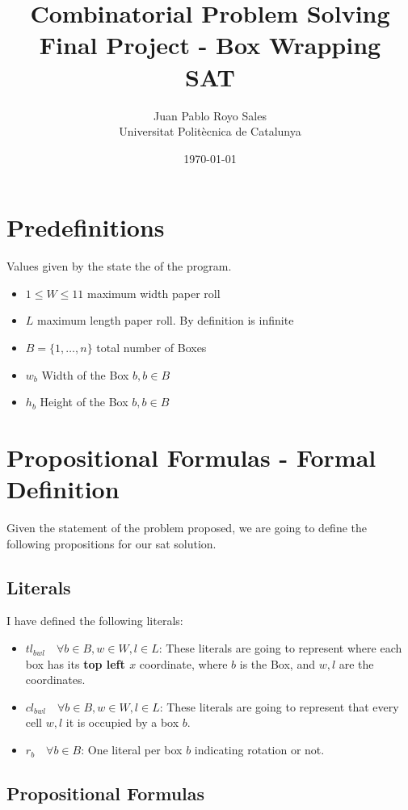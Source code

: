 \documentclass[12pt, a4paper]{article}
\title{%
      Combinatorial Problem Solving \\
      Final Project - Box Wrapping \\
      SAT
}
\author{%
  Juan Pablo Royo Sales \\
  \small{Universitat Politècnica de Catalunya}
}
\date\today
\begin{document}
\maketitle

\section{Predefinitions}
Values given by the state the of the program.

\begin{itemize}
  \item $1 \leq W \leq 11$ maximum width paper roll
  \item $L$ maximum length paper roll. By definition is infinite
  \item $B = \{1, \dots, n\}$ total number of Boxes
  \item $w_b$ Width of the Box $b, b \in B$
  \item $h_b$ Height of the Box $b, b \in B$
\end{itemize}

\section{Propositional Formulas - Formal Definition}
Given the statement of the problem proposed, we are going to define the following propositions for our \acrfull{sat} solution.

\subsection{Literals}
I have defined the following literals:

\begin{itemize}
  \item $tl_{bwl} \quad \forall b \in B, w \in W, l \in L$: These literals are going to represent where each box has its \textbf{top left $x$} coordinate, where $b$ is the Box, and $w, l$ are the coordinates.\label{var:tl}
  \item $cl_{bwl} \quad \forall b \in B, w \in W, l \in L$: These literals are going to represent that every cell $w, l$ it is occupied by a box $b$.\label{var:cl}
  \item $r_b \quad \forall b \in B$: One literal per box $b$ indicating rotation or not.\label{var:r}
\end{itemize}

\subsection{Propositional Formulas}\label{sub:form}
\end{document}
